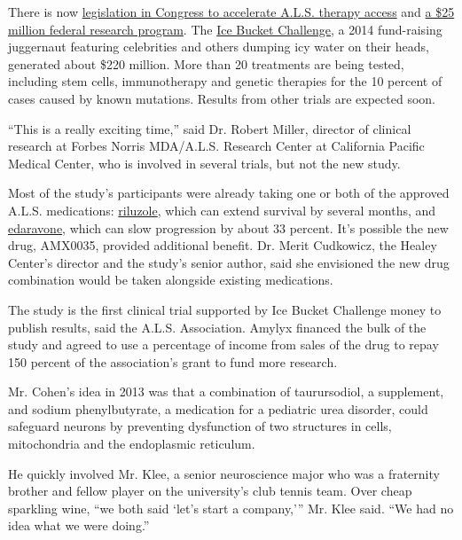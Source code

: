 There is now
\href{https://alsnewstoday.com/2020/06/03/legislation-seeks-early-access-to-promising-treatments-for-als-similar-disorders/}{legislation
in Congress to accelerate A.L.S. therapy access} and
\href{https://www.nih.gov/news-events/news-releases/nih-announces-new-transformative-research-award-program-als}{a
\$25 million federal research program}. The
\href{https://www.washingtonpost.com/news/to-your-health/wp/2015/08/19/scientists-are-crediting-the-ice-bucket-challenge-for-breakthroughs-in-research/}{Ice
Bucket Challenge}, a 2014 fund-raising juggernaut featuring celebrities
and others dumping icy water on their heads, generated about \$220
million. More than 20 treatments are being tested, including stem cells,
immunotherapy and genetic therapies for the 10 percent of cases caused
by known mutations. Results from other trials are expected soon.

``This is a really exciting time,'' said Dr. Robert Miller, director of
clinical research at Forbes Norris MDA/A.L.S. Research Center at
California Pacific Medical Center, who is involved in several trials,
but not the new study.

Most of the study's participants were already taking one or both of the
approved A.L.S. medications:
\href{https://www.nytimes3xbfgragh.onion/1995/09/19/science/committee-endorses-new-drug-for-als.html}{riluzole},
which can extend survival by several months, and
\href{https://alsnewstoday.com/2017/05/08/fda-approves-radicava-first-new-als-therapy-in-20-years-and-cause-for-hope/}{edaravone},
which can slow progression by about 33 percent. It's possible the new
drug, AMX0035, provided additional benefit. Dr. Merit Cudkowicz, the
Healey Center's director and the study's senior author, said she
envisioned the new drug combination would be taken alongside existing
medications.

The study is the first clinical trial supported by Ice Bucket Challenge
money to publish results, said the A.L.S. Association. Amylyx financed
the bulk of the study and agreed to use a percentage of income from
sales of the drug to repay 150 percent of the association's grant to
fund more research.

Mr. Cohen's idea in 2013 was that a combination of taurursodiol, a
supplement, and sodium phenylbutyrate, a medication for a pediatric urea
disorder, could safeguard neurons by preventing dysfunction of two
structures in cells, mitochondria and the endoplasmic reticulum.

He quickly involved Mr. Klee, a senior neuroscience major who was a
fraternity brother and fellow player on the university's club tennis
team. Over cheap sparkling wine, ``we both said `let's start a
company,''' Mr. Klee said. ``We had no idea what we were doing.''

